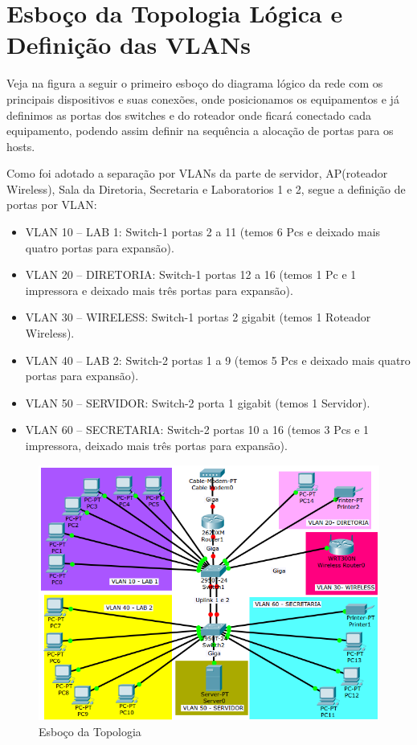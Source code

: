 \documentclass[	DIV=calc,%
							paper=a4,%
							fontsize=12pt,%
							onecolumn]{scrartcl}	 					%
\begin{document}
\section{Esboço da Topologia Lógica e Definição das VLANs}

Veja na figura a seguir o primeiro esboço do diagrama lógico da rede com os principais dispositivos e suas conexões, onde posicionamos os equipamentos e já definimos as portas dos switches e do roteador onde ficará conectado cada equipamento, podendo assim definir na sequência a alocação de portas para os hosts.


Como foi adotado a separação por VLANs da parte de servidor, AP(roteador Wireless), Sala da Diretoria, Secretaria e Laboratorios 1 e 2, segue a definição de portas por VLAN: 

\begin{itemize}
	\item VLAN 10 – LAB 1: Switch-1 portas 2 a 11 (temos 6 Pcs e deixado mais quatro portas para expansão).
	\item VLAN 20 – DIRETORIA: Switch-1 portas 12 a 16 (temos 1 Pc e 1 impressora e deixado mais três portas para expansão). 
	\item VLAN 30 – WIRELESS: Switch-1 portas 2 gigabit (temos 1 Roteador Wireless). 
	\item VLAN 40 – LAB 2: Switch-2 portas 1 a 9 (temos 5 Pcs  e deixado mais quatro portas para expansão). 
	\item VLAN 50 – SERVIDOR: Switch-2 porta 1 gigabit (temos 1 Servidor).
	\item VLAN 60 – SECRETARIA: Switch-2 portas 10 a 16 (temos 3 Pcs e 1 impressora, deixado mais três portas para expansão).
\end{itemize}
 
 \begin{figure}[H]
 	\centering
 	\includegraphics[width=\textwidth]{fig2}
 	\caption{Esboço da Topologia}
 	\label{fig2}
 \end{figure}
\end{document}
